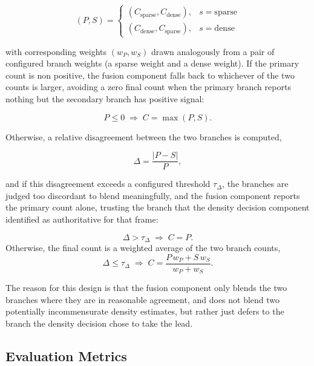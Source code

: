 \begin{equation}
	(P,S) =
	\begin{cases}
		(C_{\text{sparse}}, C_{\text{dense}}), & s = \text{sparse} \\
		(C_{\text{dense}}, C_{\text{sparse}}), & s = \text{dense}
	\end{cases}
\end{equation}

with corresponding weights $(w_P,w_S)$ drawn analogously from a pair of configured branch weights (a sparse weight and a dense weight). If the primary count is non positive, the fusion component falls back to whichever of the two counts is larger, avoiding a zero final count when the primary branch reports nothing but the secondary branch has positive signal:

\begin{equation}
	P \le 0 \;\Rightarrow\; C = \max(P,S).
\end{equation}

Otherwise, a relative disagreement between the two branches is computed,

\begin{equation}
	\Delta = \frac{|P-S|}{P},
\end{equation}

and if this disagreement exceeds a configured threshold $\tau_{\Delta}$, the branches are judged too discordant to blend meaningfully, and the fusion component reports the primary count alone, trusting the branch that the density decision component identified as authoritative for that frame:

\begin{equation}
	\Delta > \tau_{\Delta} \;\Rightarrow\; C = P.
\end{equation}
Otherwise, the final count is a weighted average of the two branch counts,
\begin{equation}
	\Delta \le \tau_{\Delta} \;\Rightarrow\; C = \frac{P\,w_P + S\,w_S}{w_P + w_S}.
\end{equation}

The reason for this design is that the fusion component only blends the two branches where they are in reasonable agreement, and does not blend two potentially incommensurate density estimates, but rather just defers to the branch the density decision chose to take the lead.

\subsection{Evaluation Metrics}
\label{subsec:evaluation-metrics}

